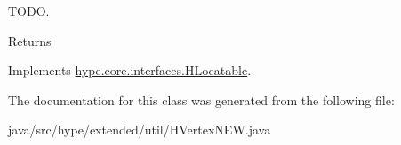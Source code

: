 T\-O\-D\-O. 

\begin{DoxyReturn}{Returns}

\end{DoxyReturn}


Implements \hyperlink{interfacehype_1_1core_1_1interfaces_1_1_h_locatable_a39eb12015a40fe494f789607dec9c484}{hype.\-core.\-interfaces.\-H\-Locatable}.



The documentation for this class was generated from the following file\-:\begin{DoxyCompactItemize}
\item 
java/src/hype/extended/util/H\-Vertex\-N\-E\-W.\-java\end{DoxyCompactItemize}
